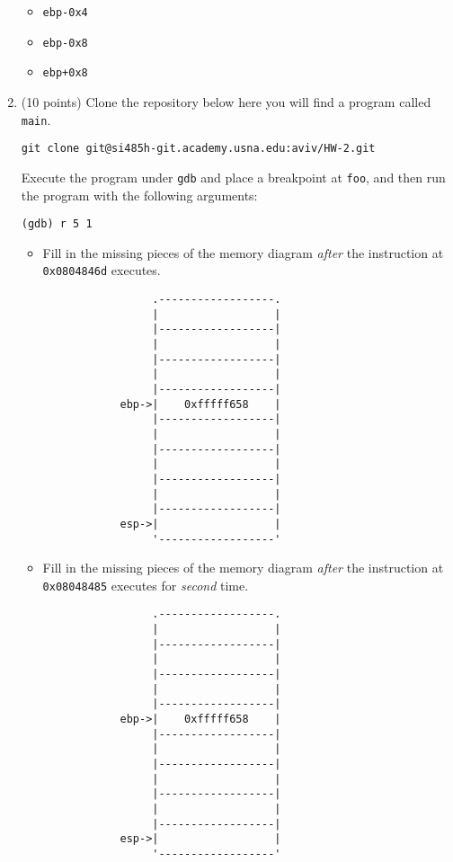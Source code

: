 \documentclass{article}[9pt]
\begin{document}
\begin{enumerate}
\begin{itemize}
\item \texttt{ebp-0x4}
\item \texttt{ebp-0x8}
\item \texttt{ebp+0x8}
\end{itemize}

\item (10 points) Clone the repository below here you will find a program called \texttt{main}.
\begin{verbatim}
git clone git@si485h-git.academy.usna.edu:aviv/HW-2.git
\end{verbatim}
Execute the program under \texttt{gdb} and place a breakpoint at \texttt{foo},
and then run the program with the following arguments:
\begin{verbatim}
(gdb) r 5 1
\end{verbatim}

\begin{itemize}
\item Fill in the missing pieces of the memory diagram \emph{after} the
instruction at \texttt{0x0804846d} executes.
\begin{verbatim}
                 .------------------.
                 |                  |
                 |------------------|
                 |                  |
                 |------------------|
                 |                  |
                 |------------------|
            ebp->|    0xfffff658    |
                 |------------------|
                 |                  | 
                 |------------------|
                 |                  |
                 |------------------|
                 |                  |
                 |------------------|
            esp->|                  |
                 '------------------'
\end{verbatim}

\item Fill in the missing pieces of the memory diagram \emph{after} the
instruction at \texttt{0x08048485} executes for \emph{second} time.

\begin{verbatim}
                 .------------------.
                 |                  |
                 |------------------|
                 |                  |
                 |------------------|
                 |                  |
                 |------------------|
            ebp->|    0xfffff658    |
                 |------------------|
                 |                  | 
                 |------------------|
                 |                  |
                 |------------------|
                 |                  |
                 |------------------|
            esp->|                  |
                 '------------------'
\end{verbatim}
\end{itemize}


\end{enumerate}
\end{document}
